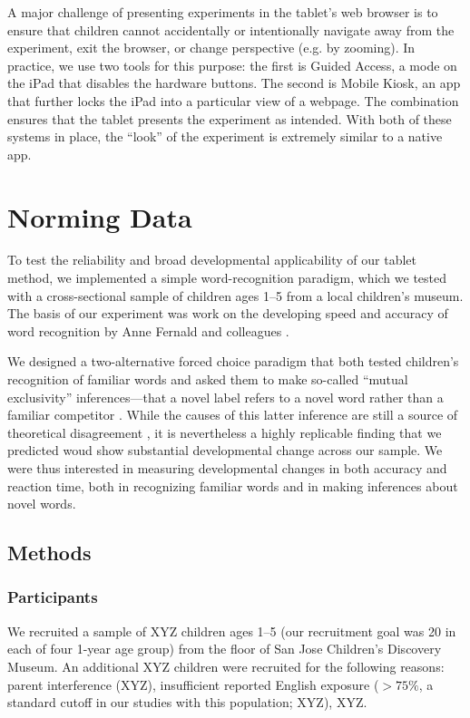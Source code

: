 \documentclass[man,noapacite]{apa2}
\begin{document}
A major challenge of presenting experiments in the tablet's web browser is to ensure that children cannot accidentally or intentionally navigate away from the experiment, exit the browser, or change perspective (e.g. by zooming). In practice, we use two tools for this purpose: the first is Guided Access, a mode on the iPad that disables the hardware buttons. The second is Mobile Kiosk, an app that further locks the iPad into a particular view of a webpage. The combination ensures that the tablet presents the experiment as intended. With both of these systems in place, the ``look'' of the experiment is extremely similar to a native app. 

\section{Norming Data}
 
To test the reliability and broad developmental applicability of our tablet method, we implemented a simple word-recognition paradigm, which we tested with a cross-sectional sample of children ages 1--5 from a local children's museum. The basis of our experiment was work on the developing speed and accuracy of word recognition by Anne Fernald and colleagues \cite{fernald1998,fernald2006,bion2013}. 

We designed a two-alternative forced choice paradigm that both tested children's recognition of familiar words and asked them to make so-called ``mutual exclusivity'' inferences---that a novel label refers to a novel word rather than a familiar competitor \cite{markman1988}. While the causes of this latter inference are still a source of theoretical disagreement \cite{markman2003,diesendruck2001,frank2009,bion2013}, it is nevertheless a highly replicable finding that we predicted woud show substantial developmental change across our sample.  We were thus interested in measuring developmental changes in both accuracy and reaction time, both in recognizing familiar words and in making inferences about novel words. 

\subsection{Methods}

\subsubsection{Participants} 

We recruited a sample of XYZ children ages 1--5 (our recruitment goal was 20 in each of four 1-year age group) from the floor of San Jose Children's Discovery Museum. An additional XYZ children were recruited for the following reasons: parent interference (XYZ), insufficient reported English exposure ($>75\%$, a standard cutoff in our studies with this population; XYZ), XYZ. 
\end{document}
